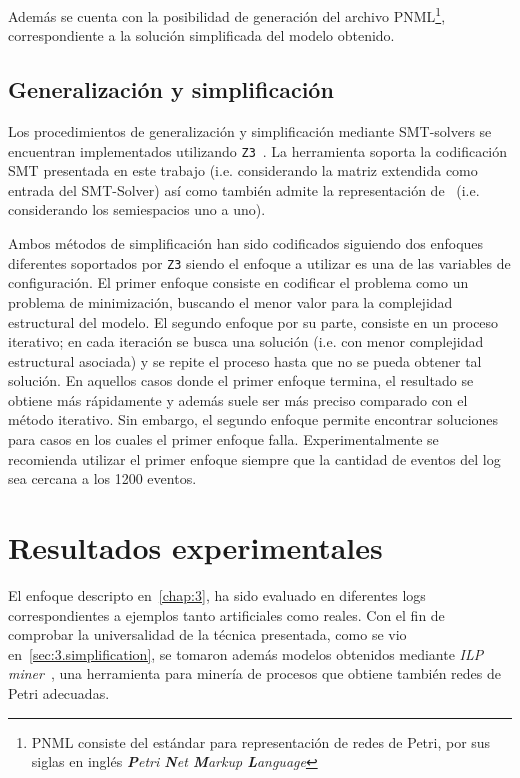 Además se cuenta con la posibilidad de generación del archivo PNML\footnote{PNML consiste del estándar para representación
de redes de Petri, por sus siglas en inglés \textit{\textbf{P}etri \textbf{N}et \textbf{M}arkup \textbf{L}anguage}},
correspondiente a la solución simplificada del modelo obtenido.

\subsection{Generalización y simplificación}
\label{sec:4.simplification}

Los procedimientos de generalización y simplificación mediante SMT-solvers se encuentran implementados utilizando \texttt{Z3}~\cite{MouraB08}. 
La herramienta soporta la codificación SMT presentada en este trabajo (i.e. considerando la matriz extendida
como entrada del SMT-Solver) así como también admite la representación de~\cite{LeonCB15} (i.e. considerando los semiespacios uno a uno).

Ambos métodos de simplificación han sido codificados siguiendo dos enfoques diferentes soportados por \texttt{Z3}
siendo el enfoque a utilizar es una de las variables de configuración.
El primer enfoque consiste en codificar el problema como un problema de minimización, buscando 
el menor valor para la complejidad estructural del modelo.
El segundo enfoque por su parte, consiste en un proceso iterativo; en cada iteración se busca
una  solución (i.e. con menor complejidad estructural asociada) y se repite el proceso
hasta que no se pueda obtener tal solución.
En aquellos casos donde el primer enfoque termina, el resultado se obtiene más rápidamente y además 
suele ser más preciso comparado con el método iterativo. Sin embargo, el segundo enfoque
permite encontrar soluciones para casos en los cuales el primer enfoque falla.
Experimentalmente se recomienda utilizar el primer enfoque siempre que la cantidad de eventos del log
sea cercana a los 1200 eventos.

\section{Resultados experimentales}
\label{sec:4.experiments}

El enfoque descripto en~\autoref{chap:3}, ha sido evaluado en diferentes logs correspondientes
a ejemplos tanto artificiales como reales. Con el fin de comprobar la universalidad de la técnica presentada,
como se vio en~\autoref{sec:3.simplification}, se tomaron además modelos obtenidos mediante \textit{ILP miner}~\cite{WDHS08},
una herramienta para minería de procesos que obtiene también redes de Petri adecuadas.

